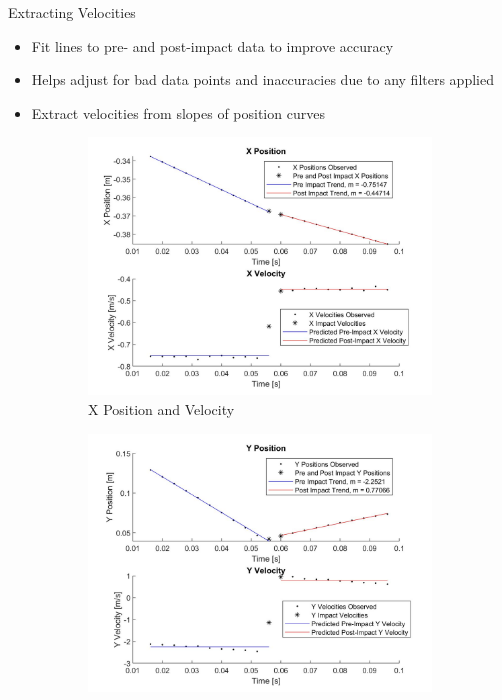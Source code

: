\begin{frame}{Extracting Velocities}
    \begin{itemize}
        \item Fit lines to pre- and post-impact data to improve accuracy
        \item Helps adjust for bad data points and inaccuracies due to any filters applied
        \item Extract velocities from slopes of position curves
    \end{itemize}
    
    \begin{figure}[h!]
        \centering
         \begin{subfigure}[b]{0.45\linewidth}
                \centering
                \includegraphics[scale=0.09]{figures/xTrial6.jpg}
                \caption{X Position and Velocity}
                \label{fig:xt6}
        \end{subfigure}
        \begin{subfigure}[b]{0.45\linewidth}
                \centering
                \includegraphics[scale=0.09]{figures/yTrial6.jpg}

\end{subfigure}
\end{figure}
\end{frame}
